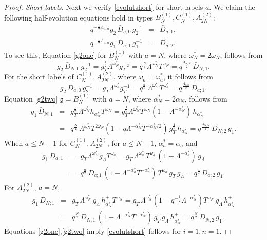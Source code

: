 \documentclass[12pt]{amsart}
\newcommand{\barD}{\bar D}
\newcommand{\g}{{\mathfrak{g}}}
\newcommand{\al}{{\alpha}}
\newcommand{\lL}{{\Lambda}}
\newcommand{\half}{\frac{1}{2}}
\numberwithin{equation}{section}
\begin{document}
\begin{proof}
%
{\em Short labels.} Next we verify \eqref{evolutshort} for short labels $a$. We claim the following half-evolution equations hold 
%
%
in types $B_N^{(1)}, C_N^{(1)}, A_{2N}^{(2)}$:
%
\begin{eqnarray} q^{-\half \lL_{a,a}} g_2\, \barD_{a;0}\,g_2^{-1}&=&\barD_{a;1},\label{g2one}\\
q^{-\half \lL_{a,a}} g_1\, \barD_{a;1}\,g_1^{-1}&=&\barD_{a;2}.\label{g2two}
\end{eqnarray}
%
%
To see this, Equation \eqref{g2one} for $B_N^{(1)}$ with $a=N$, where $\omega_N^*=2\omega_N$, follows from
$$g_2\, \barD_{N;0}\,g_2^{-1}=g_T^{\half}\lL^{\omega_N^*}g_T^{-\half}=q^{\frac N4} \lL^{\omega_N^*}T^{\omega_N}
=q^{\frac{\Lambda_{N,N}}{2}}\, \barD_{N;1}.$$
%
For the short labels of $C_N^{(1)},A_{2N}^{(2)}$, where $\omega_a=\omega_a^*$, it follows from
$$g_2\, \barD_{a;0}\,g_2^{-1}=g_T\lL^{\omega_a^*}g_T^{-1}=q^{\frac{a}{2}}\, \lL^{\omega_a^*} \,T^{\omega_a^*}=
q^{\frac{\Lambda_{a,a}}{2}} \,\barD_{a;1}.$$
Equation \eqref{g2two} $\g=B_N^{(1)}$ with $a=N$, where $\al_N^*=2\al_N$, follows from
\begin{eqnarray*}
g_1\, \barD_{N;1}&=& g_T^\half\, \lL^{\omega_N^*} h_{\al_N^*} T^{\omega_N}=g_T^\half 
\lL^{\omega_N^*} T^{\omega_N}(1-\lL^{-\al_N^*})\, h_{\al_N^*}\\
&=& q^{\frac{N}{4}}\, \lL^{\omega_N^*} T^{2\omega_N}(1-q \lL^{-\al_N^*}T^{-\al_N^*/2} )\,g_T^\half\,h_{\al_N^*}
=q^{\frac{\Lambda_{N,N}}{2}}\, \barD_{N;2} \,g_1.
\end{eqnarray*}
%
When $a\leq N-1$ for $C_N^{(1)},A_{2N}^{(2)}$, for $a\leq N-1$, $\al_a^*=\al_a$ and
\begin{eqnarray*}
g_1\, \barD_{a;1}&=& g_T \lL^{\omega_a^*}\, g_\lL T^{\omega_a} =g_T \,
\lL^{\omega_a^*}\,T^{\omega_a} \,(1-\lL^{-\al_a^*})\, g_\lL\\
&=& q^{\frac{a}{2}} \, \barD_{a;1}\, (1-\lL^{-\al_a^*}T^{-\al_a^*})\,T^{\omega_a}\,g_T\,g_\lL=q^{\frac{a}{2}} \, \barD_{a;2}\,g_1 .
\end{eqnarray*}
%
For $A_{2N}^{(2)}$, $a=N$, 
\begin{eqnarray*}
g_1\, \barD_{N;1}&=& g_T \, \lL^{\omega_N^*}\,g_\lL\, h_{\al_N^*}^+ T^{\omega_N} =
g_T \, \lL^{\omega_N^*} (1-q^{-\half} \lL^{-\al_N^*}) T^{\omega_N}\,g_\lL\, h_{\al_N^*}^+\\
&=&q^{\frac{N}{2}}\, \barD_{N;1}\, (1- \lL^{-\al_N^*}T^{-\al_N^*})\,g_T\,g_\lL\, h_{\al_N^*}^+=
q^{\frac{N}{2}}\, \barD_{N;2}\,g_1.
\end{eqnarray*}
Equations \eqref{g2one},\eqref{g2two} imply \eqref{evolutshort} follows for $i=1,n=1$.
%
%


\end{proof}
\end{document}
